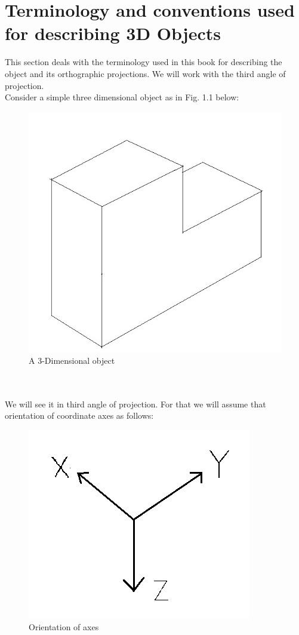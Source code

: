 \documentclass[a4paper,11pt,openany]{book}
\begin{document}
\section{Terminology and conventions used for describing 3D Objects}
\indent This section deals with the terminology used in this book for describing the object and its orthographic projections. We will work with the third angle of projection. \\
\indent Consider a simple three dimensional object as in Fig. 1.1 below:
\begin{figure}[h]
\centering
\includegraphics[scale=0.4]{obj}
\caption{A 3-Dimensional object}
\label{a3dObj}
\end{figure}
\\ \\
\indent We will see it in third angle of projection. For that we will assume that orientation of coordinate axes as follows:
\begin{figure}[!h]
\centering
\includegraphics[scale=0.3]{direc}
\caption{Orientation of axes}
\end{figure}
\end{document}
